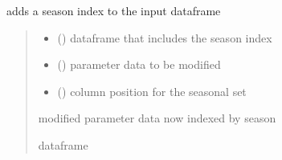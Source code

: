 \documentclass[letterpaper,10pt,english]{sphinxmanual}
\begin{document}
\begin{fulllineitems}
\label{\detokenize{src.models.electricity.scripts.preprocessor:src.models.electricity.scripts.preprocessor.add_season_index}}
\pysigstartsignatures
\pysiglinewithargsret
{}
{\sphinxparamcomma {}\sphinxparamcomma {}}
{}
\pysigstopsignatures
\sphinxAtStartPar
adds a season index to the input dataframe
\begin{quote}\begin{description}
\begin{itemize}
\item {} 
\sphinxAtStartPar
{} () \textendash{} dataframe that includes the season index

\item {} 
\sphinxAtStartPar
{} () \textendash{} parameter data to be modified

\item {} 
\sphinxAtStartPar
{} () \textendash{} column position for the seasonal set

\end{itemize}

\sphinxAtStartPar
modified parameter data now indexed by season

\sphinxAtStartPar
dataframe

\end{description}\end{quote}

\end{fulllineitems}

\end{document}
